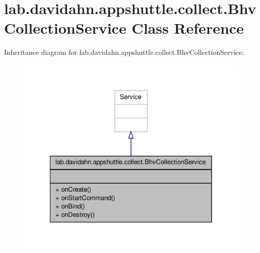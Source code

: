 \hypertarget{classlab_1_1davidahn_1_1appshuttle_1_1collect_1_1_bhv_collection_service}{\section{lab.\-davidahn.\-appshuttle.\-collect.\-Bhv\-Collection\-Service \-Class \-Reference}
\label{classlab_1_1davidahn_1_1appshuttle_1_1collect_1_1_bhv_collection_service}
}


\-Inheritance diagram for lab.\-davidahn.\-appshuttle.\-collect.\-Bhv\-Collection\-Service\-:
\nopagebreak
\begin{figure}[H]
\begin{center}
\leavevmode
\includegraphics[width=328pt]{classlab_1_1davidahn_1_1appshuttle_1_1collect_1_1_bhv_collection_service__inherit__graph}
\end{center}
\end{figure}


